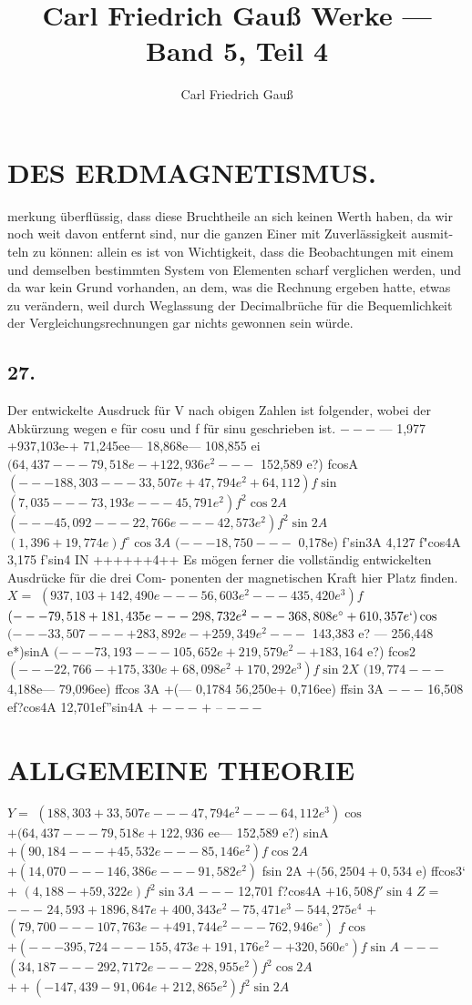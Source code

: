 \documentclass[12pt,a4paper]{article}
\title{Carl Friedrich Gauß Werke --- Band 5, Teil 4}
\author{Carl Friedrich Gauß}
\date{}
\begin{document}
\maketitle

\tableofcontents
\newpage


\section*{DES ERDMAGNETISMUS.}
merkung überflüssig, dass diese Bruchtheile an sich keinen Werth haben, da wir noch weit davon entfernt sind, nur die ganzen Einer mit Zuverlässigkeit ausmit- teln zu können: allein es ist von Wichtigkeit, dass die Beobachtungen mit einem und demselben bestimmten System von Elementen scharf verglichen werden, und da war kein Grund vorhanden, an dem, was die Rechnung ergeben hatte, etwas zu verändern, weil durch Weglassung der Decimalbrüche für die Bequemlichkeit der Vergleichungsrechnungen gar nichts gewonnen sein würde.

\subsection*{27.}
Der entwickelte Ausdruck für V nach obigen Zahlen ist folgender, wobei der Abkürzung wegen e für cosu und f für sinu geschrieben ist.
$---$
--- 1,977 +937,103e-+ 71,245ee--- 18,868e--- 108,855 ei
$(64,437 --- 79,518e-+122,936e^2---$
152,589 e?) fcosA
$(---188,303--- 33,507e+ 47,794e^2+ 64,112) f\sin$
$(7,035 --- 73,193e--- 45,791e^2) f^2\cos 2A$
$(--- 45,092 --- 22,766e--- 42,573e^2) f^2\sin 2A$
$(1,396 + 19,774e)f^\circ\cos 3A$
$(---18,750---$
0,178e) f'sin3A 4,127 f"cos4A 3,175 f'sin4 IN ++++++4++ Es mögen ferner die vollständig entwickelten Ausdrücke für die drei Com- ponenten der magnetischen Kraft hier Platz finden.
$X=$
$(937,103 +142,490 e--- 56,603e^2--- 435,420 e^3) f$
$(--- 79,518 + 181,435 e--- 298,732 e^2--- 368,808 e^\circ+ 610,357 e`) \cos$
$(--- 33,507 ---+283,892e-+259,349e^2---$
143,383 e? --- 256,448 e*)sinA
$(--- 73,193 --- 105,652e+219,579e^2-+183,164$
e?) fcos2
$(--- 22,766-+175,330e+ 68,098e^2+ 170,292 e^3) f\sin 2X$
$(19,774---$
4,188e--- 79,096ee) ffcos 3A +(--- 0,1784 56,250e+ 0,716ee) ffsin 3A
$---$
16,508 ef?cos4A 12,701ef''sin4A
$+$
$---$
$+$
--
$---$


\newpage


\section*{ALLGEMEINE THEORIE}
$Y=$
$(188,303+ 33,507e--- 47,794e^2--- 64,112e^3)\cos$
$+ (64,437 --- 79,518e+122,936$
ee--- 152,589 e?) sinA
$+ (90,184---+ 45,532e--- 85,146e^2) f\cos 2A$
$+ (14,070 ---146,386e--- 91,582e^2)$
fsin 2A
$+ (56,2504+ 0,534$
e) ffcos3`
$+$
$(4,188-+ 59,322e) f^2\sin 3A$
$---$
12,701 f?cos4A
$+ 16,508 f'\sin4$
$Z=$
$---$
$24,593 + 1896,847e + 400,343e^2 - 75,471e^3 - 544,275 e^4$
$+$
$(79,700 --- 107,763e-+491,744e^2---762,946e^\circ)$
$f\cos$
$+(---395,724--- 155,473e+191,176e^2-+320,560e^\circ)f\sin A$
$---$
$(34,187 --- 292,7172e--- 228,955e^2) f^2\cos 2A$
$++ (-147,439 - 91,064e + 212,865 e^2) f^2\sin 2A$
\end{document}
